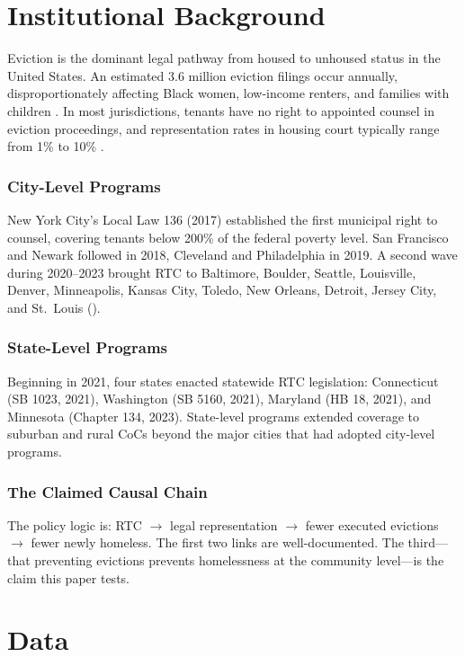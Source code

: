 \documentclass[12pt]{article}
\begin{document}
\section{Institutional Background}
\label{sec:background}

Eviction is the dominant legal pathway from housed to unhoused status in the United States. An estimated 3.6 million eviction filings occur annually, disproportionately affecting Black women, low-income renters, and families with children \citep{desmond2016, desmond2012}. In most jurisdictions, tenants have no right to appointed counsel in eviction proceedings, and representation rates in housing court typically range from 1\% to 10\% \citep{engler2010}.

\subsubsection*{City-Level Programs} New York City's Local Law 136 (2017) established the first municipal right to counsel, covering tenants below 200\% of the federal poverty level. San Francisco and Newark followed in 2018, Cleveland and Philadelphia in 2019. A second wave during 2020--2023 brought RTC to Baltimore, Boulder, Seattle, Louisville, Denver, Minneapolis, Kansas City, Toledo, New Orleans, Detroit, Jersey City, and St.\ Louis ().

\subsubsection*{State-Level Programs} Beginning in 2021, four states enacted statewide RTC legislation: Connecticut (SB 1023, 2021), Washington (SB 5160, 2021), Maryland (HB 18, 2021), and Minnesota (Chapter 134, 2023). State-level programs extended coverage to suburban and rural CoCs beyond the major cities that had adopted city-level programs.

\subsubsection*{The Claimed Causal Chain} The policy logic is: RTC $\rightarrow$ legal representation $\rightarrow$ fewer executed evictions $\rightarrow$ fewer newly homeless. The first two links are well-documented. The third---that preventing evictions prevents homelessness at the community level---is the claim this paper tests.


\section{Data}
\label{sec:data}
\end{document}
